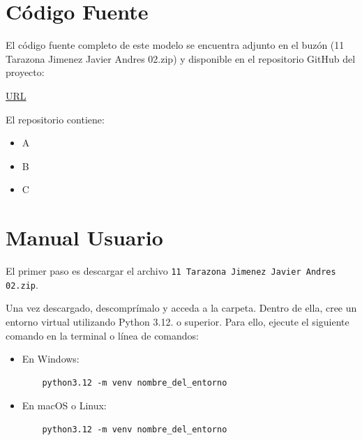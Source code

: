 \documentclass{article}
\begin{document}

\section{Código Fuente}\label{sec:cod}

El código fuente completo de este modelo se encuentra adjunto en el buzón
(11 Tarazona Jimenez Javier Andres 02.zip)
y disponible en el repositorio GitHub del proyecto:

\begin{center}
  \url{URL}
\end{center}

El repositorio contiene:
\begin{itemize}
  \item A
  \item B
  \item C
\end{itemize}


\section{Manual Usuario}\label{sec:man_u}

El primer paso es descargar el archivo \texttt{11 Tarazona Jimenez Javier Andres 02.zip}.

Una vez descargado, descomprímalo y acceda a la carpeta. Dentro de ella, cree un
entorno virtual utilizando Python 3.12. o superior. Para ello, ejecute el siguiente
comando en
la terminal o línea de comandos:

\begin{itemize}
  \item En Windows:
        \begin{verbatim}
    python3.12 -m venv nombre_del_entorno
  \end{verbatim}
  \item En macOS o Linux:
        \begin{verbatim}
    python3.12 -m venv nombre_del_entorno
  \end{verbatim}
\end{itemize}
\end{document}
